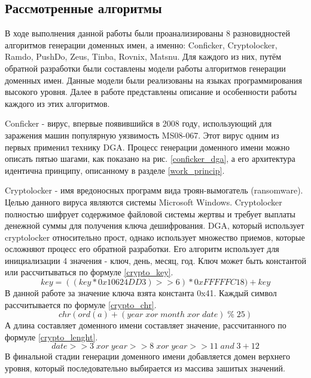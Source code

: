     \subsection{Рассмотренные алгоритмы}\label{dga_teor}
    В ходе выполнения данной работы были проанализированы 8 разновидностей алгоритмов генерации доменных имен, а именно: Conficker, Cryptolocker, Ramdo, PushDo, Zeus, Tinba, Rovnix, Matsnu. Для каждого из них, путём обратной разработки были составлены модели работы алгоритмов генерации доменных имен. Данные модели были реализованы на языках программирования высокого уровня. Далее в работе представлены описание и особенности работы каждого из этих алгоритмов.

Conficker - вирус, впервые появившийся в 2008 году, использующий для заражения машин популярную уязвимость MS08-067. Этот вирус одним из первых применил технику DGA. Процесс генерации доменного имени можно описать пятью шагами, как показано на рис. \ref{conficker_dga}, а его архитектура идентична принципу, описанному в разделе \ref{work_princip}.

Cryptolocker - имя вредоносных программ вида троян-вымогатель (ransomware). Целью данного вируса являются системы Microsoft Windows. Cryptolocker полностью шифрует содержимое файловой системы жертвы и требует выплаты денежной суммы для получения ключа дешифрования. DGA, который использует cryptolocker относительно прост, однако использует множество приемов, которые осложняют процесс его обратной разработки. Его алгоритм использует для инициализации 4 значения - ключ, день, месяц, год.
Ключ может быть константой или рассчитываться по формуле \ref{crypto_key}.
\begin{equation}\label{crypto_key}
key = ((key * 0x10624DD3) >> 6) * 0xFFFFFC18)+ key
\end{equation}
В данной работе за значение ключа взята константа 0x41.
Каждый символ рассчитывается по формуле \ref{crypto_chr}.
\begin{equation}\label{crypto_chr}
chr(ord(a) + (year \; xor \; month\; xor \;date) \;\% \;25)
\end{equation}
А длина составляет доменного имени составляет значение, рассчитанного по формуле \ref{crypto_lenght}.
\begin{equation}\label{crypto_lenght}
date>>3 \; xor \; year>>8 \; xor  \;year>>11 \; and \; 3 + 12
\end{equation}
В финальной стадии генерации доменного имени добавляется домен верхнего уровня, который последовательно выбирается из массива зашитых значений.

